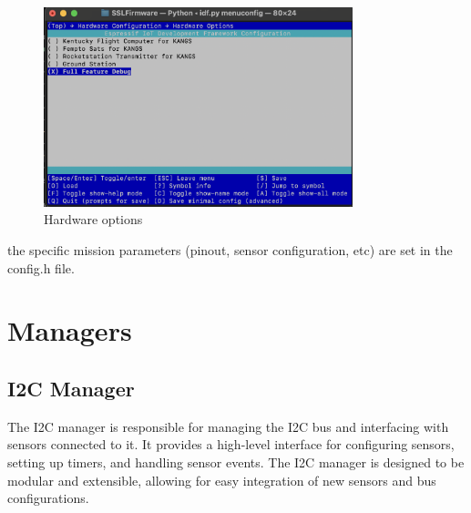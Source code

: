 \documentclass{book}
\begin{document}
\begin{figure} [H]
    \centering
    \includegraphics[width=0.8\textwidth]{images/idfMenuconfig_HardwareOptions.png}
    \caption{Hardware options}
    \label{fig:idfMenuconfig_hardware_options} 
\end{figure} 

\par the specific mission parameters (pinout, sensor configuration, etc) are set in the config.h file.



\section{Managers}

\subsection{I2C Manager}

\par The I2C manager is responsible for managing the I2C bus and interfacing with sensors connected to it. It provides a high-level interface for configuring sensors, setting up timers, and handling sensor events. The I2C manager is designed to be modular and extensible, allowing for easy integration of new sensors and bus configurations.
\end{document}
